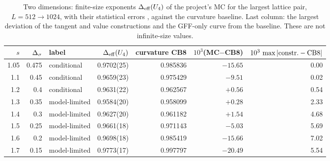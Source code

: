 \begin{table}[htbp]\centering\small
\begin{tabular}{@{}r r l r r r r@{}}
\toprule
$s$ & $\Delta_\sigma$ & label & $\Delta_{\rm eff}(U_4)$ & curvature CB8 & $10^3$(MC$-$CB8) & $10^3\,\max|{\rm constr.}-{\rm CB8}|$\\ \midrule
1.05 & 0.475 & conditional & 0.9702(25) & 0.985836 & $-15.65$ & 0.00\\
1.1 & 0.45 & conditional & 0.9659(23) & 0.975429 & $-9.51$ & 0.02\\
1.2 & 0.4 & conditional & 0.9631(22) & 0.962567 & $+0.56$ & 0.54\\
1.3 & 0.35 & model-limited & 0.9584(20) & 0.958099 & $+0.28$ & 2.33\\
1.4 & 0.3 & model-limited & 0.9627(20) & 0.961182 & $+1.54$ & 4.68\\
1.5 & 0.25 & model-limited & 0.9661(18) & 0.971143 & $-5.03$ & 5.69\\
1.6 & 0.2 & model-limited & 0.9698(18) & 0.985419 & $-15.66$ & 7.02\\
1.7 & 0.15 & model-limited & 0.9773(17) & 0.997797 & $-20.49$ & 5.54\\
\bottomrule
\end{tabular}
\caption{Two dimensions: finite-size exponents $\Delta_{\rm eff}(U_4)$ of the project's MC for
the largest lattice pair, $L=512\to1024$, with their statistical errors \cite{rs:noteMC}, against
the curvature baseline. Last column: the largest deviation of the tangent and value
constructions and the GFF-only curve from the baseline. These are not infinite-size values.}
\label{rs:tab:mc2d}
\end{table}

